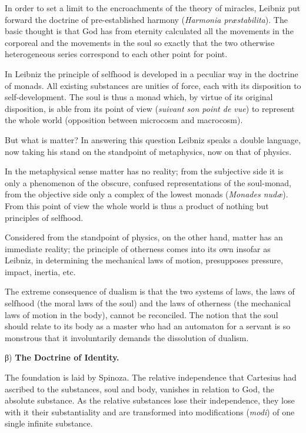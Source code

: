 \documentclass[12pt,a4paper,openany]{book}
\newcommand{\opage}[1]{\marginnote{\footnotesize\textit{[#1]}}}
\begin{document}
\opage{2}In order to set a limit to the encroachments of the theory of miracles, Leibniz put forward the doctrine of
pre-established harmony (\textit{Harmonia præstabilita}). The basic thought is that God has from eternity calculated all
the movements in the corporeal and the movements in the soul so exactly that the two otherwise heterogeneous series
correspond to each other point for point.

In Leibniz the principle of selfhood is developed in a peculiar way in the doctrine of monads. All existing substances
are unities of force, each with its disposition to self-development. The soul is thus a monad which, by virtue of its
original disposition, is able from its point of view (\textit{suivant son point de vue}) to represent the whole world
(opposition between microcosm and macrocosm).

But what is matter? In answering this question Leibniz speaks a double language, now taking his stand on the standpoint
of metaphysics, now on that of physics.

In the metaphysical sense matter has no reality; from the subjective side it is only a phenomenon of the obscure,
confused representations of the soul-monad, from the objective side only a complex of the lowest monads
(\textit{Monades nudæ}). From this point of view the whole world is thus a product of nothing but principles of
selfhood.

Considered from the standpoint of physics, on the other hand, matter has an immediate reality; the principle of
otherness comes into its own insofar as Leibniz, in determining the mechanical laws of motion, presupposes pressure,
impact, inertia, etc.

The extreme consequence of dualism is that the two systems of laws, the laws of selfhood (the moral laws of the soul)
and the laws of otherness (the mechanical laws of motion in the body), cannot be reconciled. The notion that the soul
should relate to its body as a master who had an automaton for a servant is so monstrous that it involuntarily demands
the dissolution of dualism.

\opage{3}\begin{center}β) \textbf{The Doctrine of Identity.}\end{center}

The foundation is laid by Spinoza. The relative independence that Cartesius had ascribed to the substances, soul and
body, vanishes in relation to God, the absolute substance. As the relative substances lose their independence, they lose
with it their substantiality and are transformed into modifications (\textit{modi}) of one single infinite substance.
\end{document}
